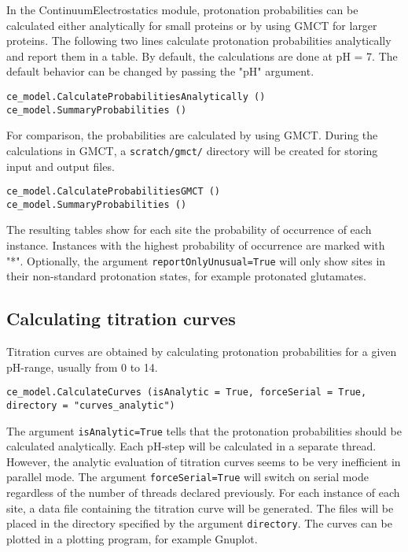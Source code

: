 \documentclass[a4paper,11pt]{article}
\newcommand{\modulename}{ContinuumElectrostatics\xspace}
\begin{document}
{\bigskip
In the \modulename module, protonation probabilities can be calculated either analytically for
small proteins or by using GMCT for larger proteins.
%
The following two lines calculate protonation probabilities analytically and report them
in a table.
%
By default, the calculations are done at pH = 7.
%
The default behavior can be changed by passing the "pH" argument. 

{\footnotesize \begin{lstlisting}
ce_model.CalculateProbabilitiesAnalytically ()
ce_model.SummaryProbabilities ()
\end{lstlisting} }


\bigskip
For comparison, the probabilities are calculated by using GMCT. 
%
During the calculations in GMCT, a \texttt{scratch/gmct/} directory will be created
for storing input and output files.

{\footnotesize \begin{lstlisting}
ce_model.CalculateProbabilitiesGMCT ()
ce_model.SummaryProbabilities ()
\end{lstlisting} }

\bigskip
The resulting tables show for each site the probability of occurrence of each instance. 
%
Instances with the highest probability of occurrence are marked with "*".
%
Optionally, the argument \texttt{reportOnlyUnusual=True} will only show sites 
in their non-standard  protonation states, for example protonated glutamates.


\subsection{Calculating titration curves}
Titration curves are obtained by calculating protonation probabilities for a given pH-range, 
usually from 0 to 14.

{\footnotesize \begin{lstlisting}
ce_model.CalculateCurves (isAnalytic = True, forceSerial = True, directory = "curves_analytic")
\end{lstlisting} }

\bigskip
The argument \texttt{isAnalytic=True} tells that the protonation probabilities should be
calculated analytically.
%
Each pH-step will be calculated in a separate thread.
%
However, the analytic evaluation of titration curves seems to be very inefficient in parallel 
mode.
%
The argument \texttt{forceSerial=True} will switch on serial mode regardless of the number 
of threads declared previously.
%
For each instance of each site, a data file containing the titration curve will be generated.
%
The files will be placed in the directory specified by the argument \texttt{directory}.
%
The curves can be plotted in a plotting program, for example Gnuplot.

}
\end{document}
